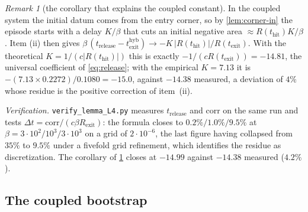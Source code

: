 \documentclass[11pt]{article}
\theoremstyle{definition}
\theoremstyle{remark}
\newtheorem{remark}[remark]{Remark}
\newcommand{\thit}{t_{\mathrm{hit}}}
\newcommand{\texit}{t_{\mathrm{exit}}}
\newcommand{\trel}{t_{\mathrm{release}}}
\newcommand{\hyb}{\mathrm{hyb}}
\begin{document}
\begin{remark}[the corollary that explains the coupled constant]\label{rem:L4cor}
In the coupled system the initial datum comes from the entry corner, so by
\cref{lem:corner-in} the episode starts with a delay $K/\beta$ that cuts an
initial negative area $\approx R(\thit)K/\beta$. Item (ii) then gives
$\beta\,(\trel-\texit^{\hyb})\to-K\,|R(\thit)|/R(\texit)$. With the theoretical
$K=1/(c|R(\thit)|)$ this is exactly $-1/(cR(\texit))=-14.81$, the universal
coefficient of \eqref{eq:release}; with the empirical $K=7.13$ it is
$-(7.13\times0.2272)/0.1080=-15.0$, against $-14.38$ measured, a deviation of
$4\%$ whose residue is the positive correction of item~(ii).
\end{remark}

\noindent\emph{Verification.} \texttt{verify\_lemma\_L4.py} measures $\trel$
and $\mathrm{corr}$ on the same run and tests
$\Delta t=\mathrm{corr}/(c\beta R_{\mathrm{exit}})$: the formula closes to
$0.2\%/1.0\%/9.5\%$ at $\beta=3\cdot10^2/10^3/3\cdot10^3$ on a grid of
$2\cdot10^{-6}$, the last figure having collapsed from $35\%$ to $9.5\%$ under a
fivefold grid refinement, which identifies the residue as discretization. The
corollary of \cref{rem:L4cor} closes at $-14.99$ against $-14.38$ measured
($4.2\%$).

\subsection{The coupled bootstrap}\label{app:L5}
\end{document}
